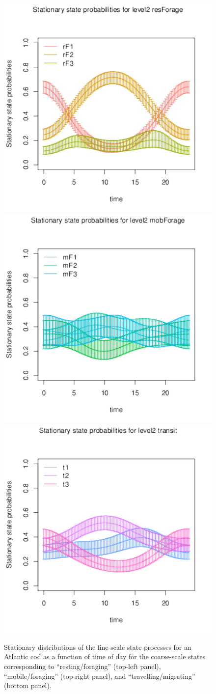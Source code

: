 \documentclass[12pt]{article}\usepackage[]{graphicx}\usepackage[]{color}
\begin{document}
\begin{figure}[htbp]
  \centering
  \includegraphics[width=.49\textwidth]{plot_codStationary001.pdf}
  \includegraphics[width=.49\textwidth]{plot_codStationary002.pdf}
  \includegraphics[width=.49\textwidth]{plot_codStationary003.pdf}
  \caption{Stationary distributions of the fine-scale state processes for an Atlantic cod as a function of time of day for the coarse-scale states corresponding to ``resting/foraging'' (top-left panel), ``mobile/foraging'' (top-right panel), and ``travelling/migrating'' (bottom panel).}
  \label{fig:codStat}
\end{figure}
\end{document}
